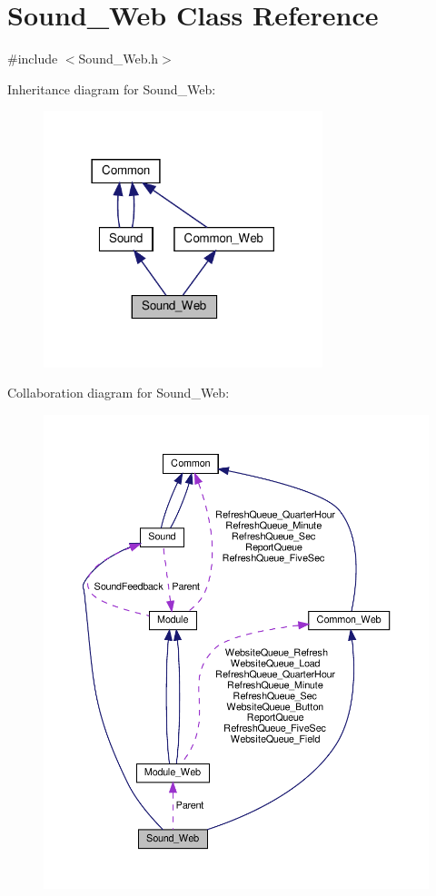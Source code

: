 \hypertarget{class_sound___web}{}\section{Sound\+\_\+\+Web Class Reference}
\label{class_sound___web}


{\ttfamily \#include $<$Sound\+\_\+\+Web.\+h$>$}



Inheritance diagram for Sound\+\_\+\+Web\+:
\nopagebreak
\begin{figure}[H]
\begin{center}
\leavevmode
\includegraphics[width=230pt]{class_sound___web__inherit__graph}
\end{center}
\end{figure}


Collaboration diagram for Sound\+\_\+\+Web\+:
\nopagebreak
\begin{figure}[H]
\begin{center}
\leavevmode
\includegraphics[width=350pt]{class_sound___web__coll__graph}
\end{center}
\end{figure}
